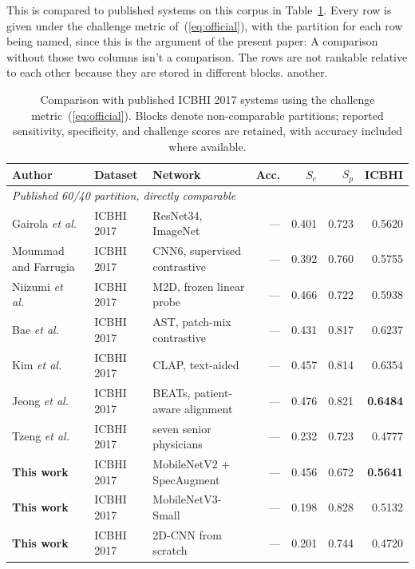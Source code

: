 \documentclass[journal,onecolumn]{IEEEtran}
\newcommand{\best}[1]{\textbf{#1}}
\begin{document}
This is compared to published systems on this corpus in Table~\ref{tab:comparison}.
Every row is given under the challenge metric of~(\ref{eq:official}), with the partition for each row being
named, since this is the argument of the present paper: A comparison without those two columns isn't a
comparison. The rows are not rankable relative to each other because they are stored in different blocks.
another.

\begin{table}[hbtp]
\centering
\caption{Comparison with published ICBHI 2017 systems using the challenge metric~(\ref{eq:official}). Blocks denote non-comparable partitions; reported sensitivity, specificity, and challenge scores are retained, with accuracy included where available.}
\label{tab:comparison}
\footnotesize
\begin{tabular}{lllrrrr}
\toprule
Author & Dataset & Network & Acc. & $S_e$ & $S_p$ & \best{ICBHI} \\
\midrule
\multicolumn{7}{l}{\emph{Published 60/40 partition, directly comparable}}\\
Gairola \emph{et al.}~\cite{respirenet2021} & ICBHI 2017 & ResNet34, ImageNet & --- & 0.401 & 0.723 & 0.5620 \\
Moummad and Farrugia~\cite{scl2023} & ICBHI 2017 & CNN6, supervised contrastive & --- & 0.392 & 0.760 & 0.5755 \\
Niizumi \emph{et al.}~\cite{frozenfm2025} & ICBHI 2017 & M2D, frozen linear probe & --- & 0.466 & 0.722 & 0.5938 \\
Bae \emph{et al.}~\cite{bae2023patchmix} & ICBHI 2017 & AST, patch-mix contrastive & --- & 0.431 & 0.817 & 0.6237 \\
Kim \emph{et al.}~\cite{bts2024} & ICBHI 2017 & CLAP, text-aided & --- & 0.457 & 0.814 & 0.6354 \\
Jeong \emph{et al.}~\cite{pafa2025} & ICBHI 2017 & BEATs, patient-aware alignment & --- & 0.476 & 0.821 & \best{0.6484} \\
Tzeng \emph{et al.}~\cite{tzeng2025jmir} & ICBHI 2017 & seven senior physicians & --- & 0.232 & 0.723 & 0.4777 \\
\addlinespace
\best{This work} & ICBHI 2017 & MobileNetV2 + SpecAugment & --- & 0.456 & 0.672 & \best{0.5641} \\
\best{This work} & ICBHI 2017 & MobileNetV3-Small & --- & 0.198 & 0.828 & 0.5132 \\
\best{This work} & ICBHI 2017 & 2D-CNN from scratch & --- & 0.201 & 0.744 & 0.4720 \\
\midrule

\end{tabular}
\end{table}
\end{document}

